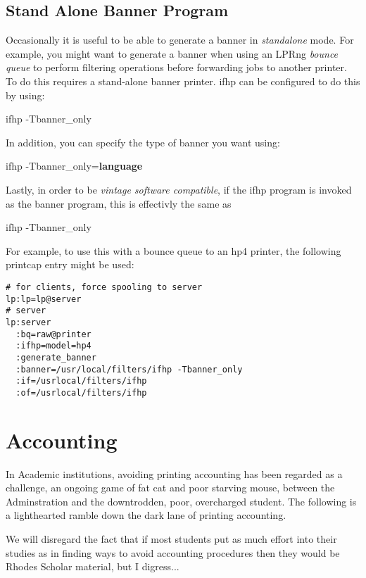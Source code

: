 \documentclass[a4paper]{article}
\begin{document}
\subsection{Stand Alone Banner Program}

Occasionally it is useful to be able to generate a banner
in
{\itshape standalone\/}
mode.
For example,
you might want to generate a banner
when using an LPRng
{\itshape bounce queue\/}
to perform filtering operations before forwarding jobs to another
printer.
To do this requires a stand-alone banner printer.
{\ttfamily ifhp} can be configured to do this by using:
\begin{tscreen}
ifhp -Tbanner\_only
\end{tscreen}

In addition,
you can specify the type of banner you want using:
\begin{tscreen}
ifhp -Tbanner\_only={\bfseries language}
\end{tscreen}


Lastly,
in order to be {\itshape vintage software compatible\/},
if the ifhp program is invoked as the
{\ttfamily banner}
program,
this is effectivly the same as
\begin{tscreen}
ifhp -Tbanner\_only
\end{tscreen}


For example,
to use this with a bounce queue to an
{\ttfamily hp4} printer,
the following printcap entry might be used:
\begin{tscreen}
\begin{verbatim}
# for clients, force spooling to server
lp:lp=lp@server
# server
lp:server
  :bq=raw@printer
  :ifhp=model=hp4
  :generate_banner
  :banner=/usr/local/filters/ifhp -Tbanner_only
  :if=/usrlocal/filters/ifhp
  :of=/usrlocal/filters/ifhp
\end{verbatim}
\end{tscreen}



\section{Accounting}

In Academic institutions, avoiding printing accounting has been
regarded as a challenge,  an ongoing game of fat cat and poor starving
mouse, between the Adminstration and the downtrodden, poor, overcharged
student.  The following is a lighthearted ramble down the dark lane of
printing accounting.

We will disregard the fact that if most students put as much effort
into their studies as in finding ways to avoid accounting procedures
then they would be Rhodes Scholar material,  but I digress...
\end{document}
